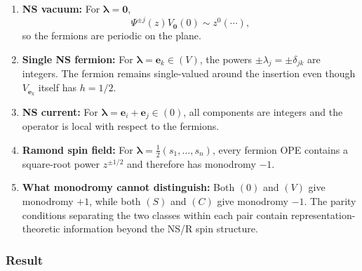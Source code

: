\documentclass[
  10pt,
  a4paper,
  openany]{book}
\begin{document}
\begin{enumerate}
\def\labelenumi{\arabic{enumi}.}
\item
  \textbf{NS vacuum:} For \(\boldsymbol\lambda=\mathbf0\), \[
  \Psi^{\pm j}(z)V_{\mathbf0}(0)
  \sim z^0(\cdots),
  \] so the fermions are periodic on the plane.
\item
  \textbf{Single NS fermion:} For
  \(\boldsymbol\lambda=\mathbf e_k\in(V)\), the powers
  \(\pm\lambda_j=\pm\delta_{jk}\) are integers. The fermion remains
  single-valued around the insertion even though \(V_{\mathbf e_k}\)
  itself has \(h=1/2\).
\item
  \textbf{NS current:} For
  \(\boldsymbol\lambda=\mathbf e_i+\mathbf e_j\in(0)\), all components
  are integers and the operator is local with respect to the fermions.
\item
  \textbf{Ramond spin field:} For
  \(\boldsymbol\lambda=\tfrac12(s_1,\ldots,s_n)\), every fermion OPE
  contains a square-root power \(z^{\pm1/2}\) and therefore has
  monodromy \(-1\).
\item
  \textbf{What monodromy cannot distinguish:} Both \((0)\) and \((V)\)
  give monodromy \(+1\), while both \((S)\) and \((C)\) give monodromy
  \(-1\). The parity conditions separating the two classes within each
  pair contain representation-theoretic information beyond the NS/R spin
  structure.
\end{enumerate}

\subsubsection{Result}\label{result-19}
\end{document}
